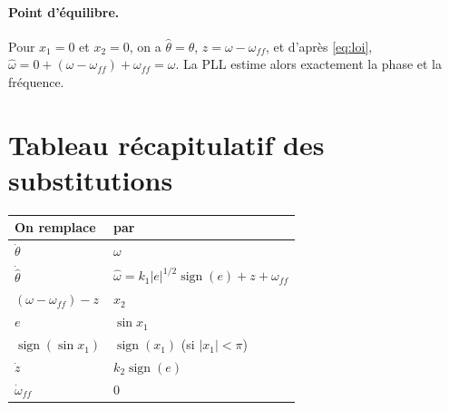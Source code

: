 \documentclass[11pt,a4paper]{article}
\newcommand{\sign}{\operatorname{sign}}
\newcommand{\hth}{\hat{\theta}}
\newcommand{\hw}{\hat{\omega}}
\begin{document}
\paragraph{Point d'équilibre.} Pour $x_1=0$ et $x_2=0$, on a $\hth=\theta$, $z=\omega-\omega_{ff}$,
et d'après \eqref{eq:loi}, $\hw = 0 + (\omega-\omega_{ff}) + \omega_{ff} = \omega$.
La PLL estime alors exactement la phase et la fréquence.

\section{Tableau récapitulatif des substitutions}
\begin{center}
\renewcommand{\arraystretch}{1.3}
\begin{tabular}{|l|l|}
\hline
On remplace & par \\
\hline
$\dot\theta$ & $\omega$ \\
$\dot{\hth}$ & $\hw = k_1|e|^{1/2}\sign(e) + z + \omega_{ff}$ \\
$(\omega-\omega_{ff})-z$ & $x_2$ \\
$e$ & $\sin x_1$ \\
$\sign(\sin x_1)$ & $\sign(x_1)$ \quad (si $|x_1|<\pi$) \\
$\dot z$ & $k_2\sign(e)$ \\
$\dot\omega_{ff}$ & $0$ \\
\hline
\end{tabular}
\end{center}
\end{document}
